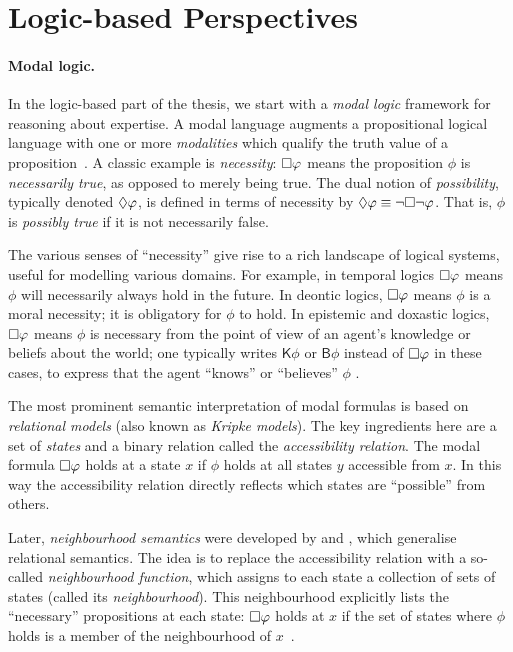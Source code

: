 \section{Logic-based Perspectives}

\paragraph{Modal logic.}

In the logic-based part of the thesis, we start with a \emph{modal logic}
framework for reasoning about expertise. A modal language augments a
propositional logical language with one or more \emph{modalities} which qualify
the truth value of a proposition~\cite{seplogicmodal}. A classic example is
\emph{necessity}: $\Box\varphi$ means the proposition $\phi$ is
\emph{necessarily true}, as opposed to merely being true. The dual notion of
\emph{possibility}, typically denoted $\Diamond\varphi$, is defined in terms of
necessity by $\Diamond\varphi \equiv \neg\Box\neg\varphi$. That is, $\phi$ is
\emph{possibly true} if it is not necessarily false.

The various senses of ``necessity'' give rise to a rich landscape of logical
systems, useful for modelling various domains. For example, in temporal logics
$\Box\varphi$ means $\phi$ will necessarily always hold in the future. In
deontic logics, $\Box\varphi$ means $\phi$ is a moral necessity; it is
obligatory for $\phi$ to hold. In epistemic and doxastic logics,
$\Box\varphi$ means $\phi$ is necessary from the point of view of an agent's
knowledge or beliefs about the world; one typically writes $\mathsf{K}\phi$ or
$\mathsf{B}\phi$ instead of $\Box\varphi$ in these cases, to express that the
agent ``knows'' or ``believes'' $\phi$ .

The most prominent semantic interpretation of modal formulas is based on
\emph{relational models} (also known as \emph{Kripke models}). The key
ingredients here are a set of \emph{states} and a binary relation called the
\emph{accessibility relation}. The modal formula $\Box\varphi$ holds at a
state $x$ if $\phi$ holds at all states $y$ accessible from $x$.\footnotemark{}
In this way the accessibility relation directly reflects which states are
``possible'' from others.


Later, \emph{neighbourhood semantics} were developed by \textcite{Scott1970}
and \textcite{montague1970universal}, which generalise relational semantics.
The idea is to replace the accessibility relation with a so-called
\emph{neighbourhood function}, which assigns to each state a collection of sets
of states (called its \emph{neighbourhood}). This neighbourhood explicitly
lists the ``necessary'' propositions at each state: $\Box\varphi$ holds at
$x$ if the set of states where $\phi$ holds is a member of the neighbourhood of
$x$~\cite{pacuit2017neighborhood}.

